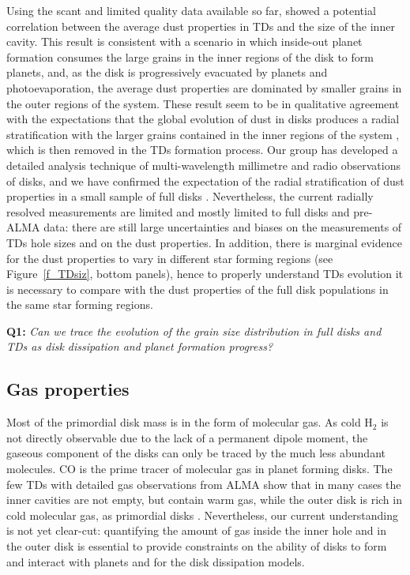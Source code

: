 \documentclass[10pt,fleqn,twoside]{article}
\begin{document}
Using the scant and limited quality data available so far, \citet{2014A&A...564A..51P} showed a potential correlation between the average dust properties in TDs and the size of the inner cavity. This result is consistent with a scenario in which inside-out planet formation consumes the large grains in the inner regions of the disk to form planets, and, as the disk is progressively evacuated by planets and photoevaporation, the average dust properties are dominated by smaller grains in the outer regions of the system. These result seem to be in qualitative agreement with the expectations that the global evolution of dust in disks produces a radial stratification with the larger grains contained in the inner regions of the system \citep{2011A&A...525A..11B,2010A&A...513A..79B}, which is then removed in the TDs formation process. Our group has developed a detailed analysis technique of multi-wavelength millimetre and radio observations of disks, and we have confirmed the expectation of the radial stratification of dust properties in a small sample of full disks \citep{2012ApJ...760L..17P,2015ApJ...813...41P,2016A&A...588A.112G,2016A&A...588A..53T}. 
Nevertheless, the current radially resolved measurements are limited and mostly limited to full disks and pre-ALMA data: there are still large uncertainties and biases on the measurements of TDs hole sizes and on the dust properties. In addition, there is marginal evidence for the dust properties to vary in different star forming regions (see Figure~\ref{f_TDsiz}, bottom panels), hence to properly understand TDs  evolution it is necessary to compare with the dust properties of the full disk populations in the same star forming regions.

\smallskip
{\bf Q1:} {\it Can we trace the evolution of the grain size distribution in full disks and TDs as disk dissipation and planet formation progress?}

\subsection{Gas properties}
Most of the primordial disk mass is in the form of molecular gas. As cold H$_2$ is not directly observable due to the lack of a permanent dipole moment, the gaseous component of the disks can only be traced by the much less abundant molecules. CO is the prime tracer of molecular gas in planet forming disks. The few TDs with detailed gas observations from ALMA show that in many cases the inner cavities are not empty, but contain warm gas, while the outer disk is rich in cold molecular gas, as primordial disks \citep{2015A&A...579A.106V}. Nevertheless, our current understanding is not yet clear-cut: quantifying the amount of gas inside the inner hole and in the outer disk is essential to provide constraints on the ability of disks to form and interact with planets and for the disk dissipation models.
\end{document}
